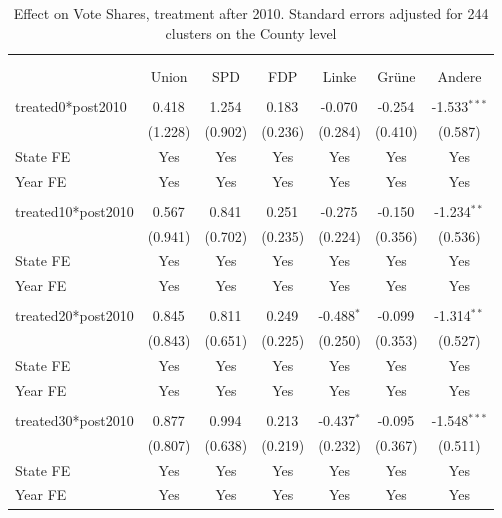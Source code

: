 \documentclass[12pt]{article}
\begin{document}
 
\begin{table}[!htbp] \centering
  \caption{Effect on Vote Shares, treatment after 2010. Standard errors adjusted for 244 clusters on the County level}
\begin{tabular}{@{\extracolsep{5pt}}lcccccc}
\\[-1.8ex]\hline
\hline \\[-1.8ex]
\\[-1.8ex] & \multicolumn{1}{c}{Union} & \multicolumn{1}{c}{SPD} & \multicolumn{1}{c}{FDP} & \multicolumn{1}{c}{Linke} & \multicolumn{1}{c}{Grüne} & \multicolumn{1}{c}{Andere}  \\
\hline \\[-1.8ex]
 treated0*post2010 & 0.418$^{}$ & 1.254$^{}$ & 0.183$^{}$ & -0.070$^{}$ & -0.254$^{}$ & -1.533$^{***}$ \\
  & (1.228) & (0.902) & (0.236) & (0.284) & (0.410) & (0.587) \\
 State FE & Yes & Yes & Yes & Yes & Yes & Yes \\
 Year FE & Yes & Yes & Yes & Yes & Yes & Yes \\
\hline \\[-1.8ex]
 treated10*post2010 & 0.567$^{}$ & 0.841$^{}$ & 0.251$^{}$ & -0.275$^{}$ & -0.150$^{}$ & -1.234$^{**}$ \\
  & (0.941) & (0.702) & (0.235) & (0.224) & (0.356) & (0.536) \\
 State FE & Yes & Yes & Yes & Yes & Yes & Yes \\
 Year FE & Yes & Yes & Yes & Yes & Yes & Yes \\
\hline \\[-1.8ex]
 treated20*post2010 & 0.845$^{}$ & 0.811$^{}$ & 0.249$^{}$ & -0.488$^{*}$ & -0.099$^{}$ & -1.314$^{**}$ \\
  & (0.843) & (0.651) & (0.225) & (0.250) & (0.353) & (0.527) \\
 State FE & Yes & Yes & Yes & Yes & Yes & Yes \\
 Year FE & Yes & Yes & Yes & Yes & Yes & Yes \\
\hline \\[-1.8ex]
 treated30*post2010 & 0.877$^{}$ & 0.994$^{}$ & 0.213$^{}$ & -0.437$^{*}$ & -0.095$^{}$ & -1.548$^{***}$ \\
  & (0.807) & (0.638) & (0.219) & (0.232) & (0.367) & (0.511) \\
 State FE & Yes & Yes & Yes & Yes & Yes & Yes \\
 Year FE & Yes & Yes & Yes & Yes & Yes & Yes \\

\end{tabular}
\end{table}
\end{document}
